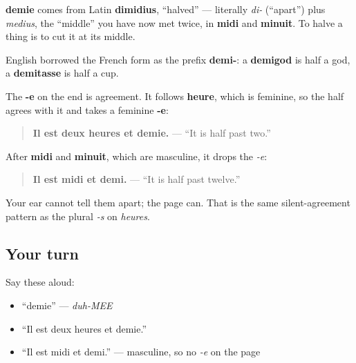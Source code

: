 \begin{cousinweb}
\textbf{demie} comes from Latin \textbf{dimidius}, \textquotedblleft{}halved\textquotedblright{} — literally \emph{di-} (\textquotedblleft{}apart\textquotedblright{}) plus \emph{medius}, the \textquotedblleft{}middle\textquotedblright{} you have now met twice, in \textbf{midi} and \textbf{minuit}. To halve a thing is to cut it at its middle.

English borrowed the French form as the prefix \textbf{demi-}: a \textbf{demigod} is half a god, a \textbf{demitasse} is half a cup.
\end{cousinweb}

\begin{grammarlens}[title={Grammar Lens: why it is demie and not demi}]
The \textbf{-e} on the end is agreement. It follows \textbf{heure}, which is feminine, so the half agrees with it and takes a feminine \textbf{-e}:

\begin{quote}
\textbf{Il est deux heures et demie.} — \textquotedblleft{}It is half past two.\textquotedblright{}
\end{quote}

After \textbf{midi} and \textbf{minuit}, which are masculine, it drops the \emph{-e}:

\begin{quote}
\textbf{Il est midi et demi.} — \textquotedblleft{}It is half past twelve.\textquotedblright{}
\end{quote}

Your ear cannot tell them apart; the page can. That is the same silent-agreement pattern as the plural \emph{-s} on \emph{heures}.
\end{grammarlens}

\subsection*{Your turn}
Say these aloud:

\begin{itemize}
\raggedright
  \item \textquotedblleft{}demie\textquotedblright{} — \emph{duh-MEE}
  \item \textquotedblleft{}Il est deux heures et demie.\textquotedblright{}
  \item \textquotedblleft{}Il est midi et demi.\textquotedblright{} — masculine, so no \emph{-e} on the page
\end{itemize}

